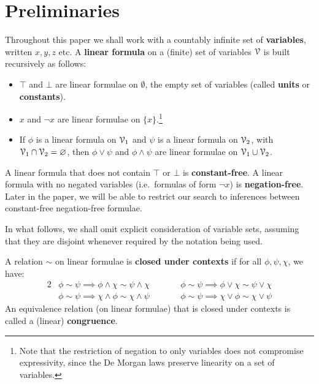 \documentclass[a4paper, UKenglish, cleveref]{lipics-v2019}
\begin{document}
\section{Preliminaries}
\label{sec:preliminaries}

Throughout this paper we shall work with a countably infinite set of \textbf{variables}, written $x,y, z$ etc.
A \textbf{linear formula} on a (finite) set of variables \(\mathcal{V}\) is built recursively as follows:
\begin{itemize}
\item \(\top\) and \(\bot\) are linear formulae on $\emptyset$, the empty set of variables (called \textbf{units} or \textbf{constants}).
\item \(x\) and \(\neg x\) are linear formulae on \(\{x\}\).\footnote{Note that the restriction of negation to only variables does not compromise expressivity, since the De Morgan laws preserve linearity on a set of variables.}
\item If \(\phi\) is a linear formula on \(\mathcal{V}_1\) and \(\psi\) is a linear formula on \(\mathcal{V}_2\), with \(\mathcal{V}_1 \cap \mathcal{V}_2  = \varnothing \), then \(\phi \lor \psi\) and \(\phi \land \psi\) are linear formulae on \(\mathcal{V}_1 \cup \mathcal{V}_2\).
\end{itemize}
A linear formula that does not contain \(\top\) or \(\bot\) is \textbf{constant-free}.
A linear formula with no negated variables (i.e.\ formulas of form $\neg x$) is \textbf{negation-free}. Later in the paper, we will be able to restrict our search to inferences between constant-free negation-free formulae.

In what follows, we shall omit explicit consideration of variable sets, assuming that they are disjoint whenever required by the notation being used.

A relation \(\sim\) on linear formulae is \textbf{closed under contexts} if for all \(\phi,\psi,\chi\), we have:
\begin{alignat*}{2}
  &\phi \sim \psi \implies \phi \land \chi \sim \psi \land \chi &\quad\quad&\phi \sim \psi \implies \phi \lor \chi \sim \psi \lor \chi\\
  &\phi \sim \psi \implies \chi \land \phi \sim \chi \land \psi &&\phi \sim \psi \implies \chi \lor \phi \sim \chi \lor \psi
\end{alignat*}
An equivalence relation (on linear formulae) that is closed under contexts is called a (linear) \textbf{congruence}.
\end{document}
